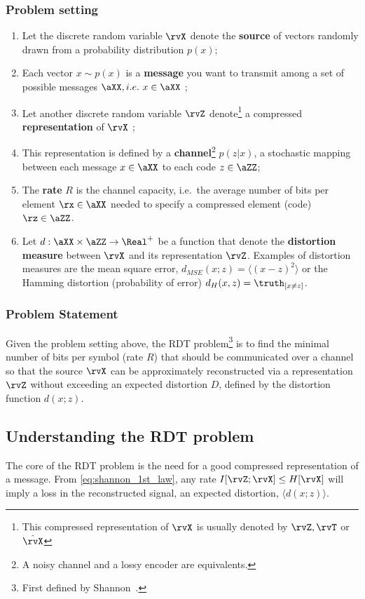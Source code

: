 \subsubsection{Problem setting}
\begin{enumerate}
	\item Let the discrete random variable $\rvX$ denote the \textbf{source} of vectors randomly drawn from a probability distribution \(p(x)\);
	\item Each vector \(x\sim p(x)\) is a \textbf{message} you want to transmit among a set of possible messages $\aXX,i.e.\  x \in \aXX$ ;
	\item Let another discrete random variable $\rvZ$ denote\footnote{This compressed representation of $\rvX$ is usually denoted by $\rvZ, \rvT$ or $\hat{\rvX}$ } a compressed \textbf{representation} of $\rvX$ ;
	\item This representation is defined by a \textbf{channel}\footnote{A noisy channel and a lossy encoder are equivalents.} $p(z|x)$, a stochastic mapping  between each message $x \in \aXX$ to each code $z \in \aZZ$;
	\item The \textbf{rate} $R$ is the channel capacity, i.e.\ the average number of bits per element $\rx \in \aXX$ needed to specify a compressed element (code) $\rz \in \aZZ$.
	\item Let $d: \aXX \times \aZZ \to \Real^{+}$ be a function that denote the \textbf{distortion measure} between $\rvX$ and its representation $\rvZ$. Examples of distortion measures are the mean square error, $d_{MSE}(x;z)=\langle (x - z)^2 \rangle$ or the Hamming distortion (probability of error) $d_{H}(x,z)=\truth_{[x \neq z]}$.
\end{enumerate}
\subsubsection{Problem Statement}
Given the problem setting above, the \ac*{RDT} problem\footnote{ First defined by Shannon~.} is to find the minimal number of bits per symbol (rate $R$) that should be communicated over a channel so that the source $\rvX$ can be approximately reconstructed via a representation $\rvZ$ without exceeding an expected distortion $D$, defined by the distortion function $d(x;z)$.

\subsection{Understanding the \ac*{RDT} problem}
The core of the \ac*{RDT} problem is the need for a good compressed representation of a message. From \cref{eq:shannon_1st_law}, any rate $I[\rvZ;\rvX] \leq H[\rvX]$ will imply a loss in the reconstructed signal, an expected distortion,  $\langle d(x;z) \rangle$.

